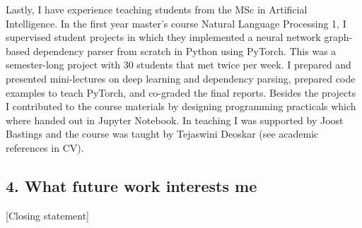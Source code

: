 \documentclass[]{article}
\begin{document}
Lastly, I have experience teaching students from the MSc in Artificial
Intelligence. In the first year master's course Natural Language
Processing 1, I supervised student projects in which they implemented a
neural network graph-based dependency parser from scratch in Python
using PyTorch. This was a semester-long project with 30 students that
met twice per week. I prepared and presented mini-lectures on deep
learning and dependency parsing, prepared code examples to teach
PyTorch, and co-graded the final reports. Besides the projects I
contributed to the course materials by designing programming practicals
which where handed out in Jupyter Notebook. In teaching I was supported
by Joost Bastings and the course was taught by Tejaswini Deoskar (see
academic references in CV).

\subsection{4. What future work interests
me}\label{what-future-work-interests-me}

{[}Closing statement{]}
\end{document}
